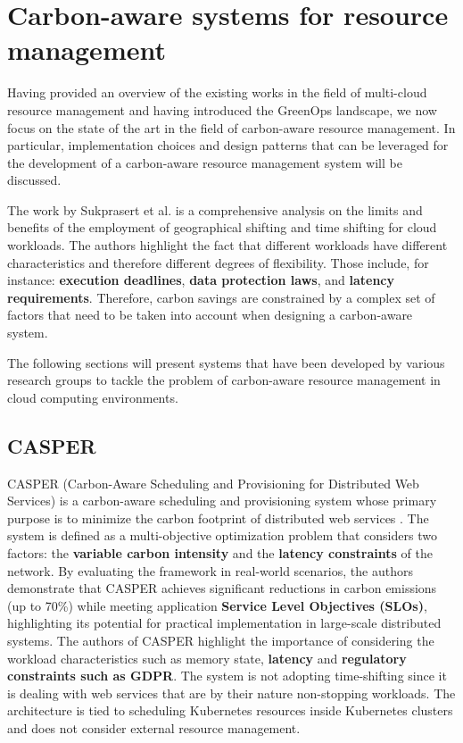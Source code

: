 \section{Carbon-aware systems for resource management}
\label{sec:carbon_aware_resource_management}

Having provided an overview of the existing works in the field of multi-cloud resource management and having introduced the GreenOps landscape, we now focus on the state of the art in the field of carbon-aware resource management.
In particular, implementation choices and design patterns that can be leveraged for the development of a carbon-aware resource management system will be discussed.
\newline

The work by Sukprasert et al. \cite{10.1145/3599733.3606301} is a comprehensive analysis on the limits and benefits of the employment of geographical shifting and time shifting for cloud workloads.
The authors highlight the fact that different workloads have different characteristics and therefore different degrees of flexibility. Those include, for instance: \textbf{execution deadlines}, \textbf{data protection laws}, and \textbf{latency requirements}. Therefore, carbon savings are constrained by a complex set of factors that need to be taken into account when designing a carbon-aware system.

The following sections will present systems that have been developed by various research groups to tackle the problem of carbon-aware resource management in cloud computing environments.


\subsection{CASPER}

CASPER (Carbon-Aware Scheduling and Provisioning for Distributed Web Services) is a carbon-aware scheduling and provisioning system whose primary purpose is to minimize the carbon footprint of distributed web services \cite{Souza_2023}.
The system is defined as a multi-objective optimization problem that considers two factors: the \textbf{variable carbon intensity} and the \textbf{latency constraints} of the network.
By evaluating the framework in real-world scenarios, the authors demonstrate that CASPER achieves significant reductions in carbon emissions (up to 70\%) while meeting application \textbf{Service Level Objectives (SLOs)}, highlighting its potential for practical implementation in large-scale distributed systems.
The authors of CASPER highlight the importance of considering the workload characteristics such as memory state, \textbf{latency} and \textbf{regulatory constraints such as GDPR}.
The system is not adopting time-shifting since it is dealing with web services that are by their nature non-stopping workloads. The architecture is tied to scheduling Kubernetes resources inside Kubernetes clusters and does not consider external resource management.

